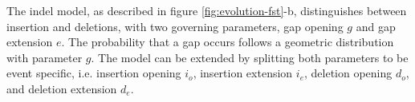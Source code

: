 The indel model, as described in figure \ref{fig:evolution-fst}-b,
distinguishes between insertion and deletions, with two governing parameters,
gap opening $g$ and gap extension $e$.
The probability that a gap occurs follows a geometric distribution with
parameter $g$.
%
%
%
%
%
The model can be extended by splitting both parameters to be event specific,
i.e. insertion opening $i_o$, insertion extension $i_e$, deletion opening $d_o$,
and deletion extension $d_e$.

%
%
%

